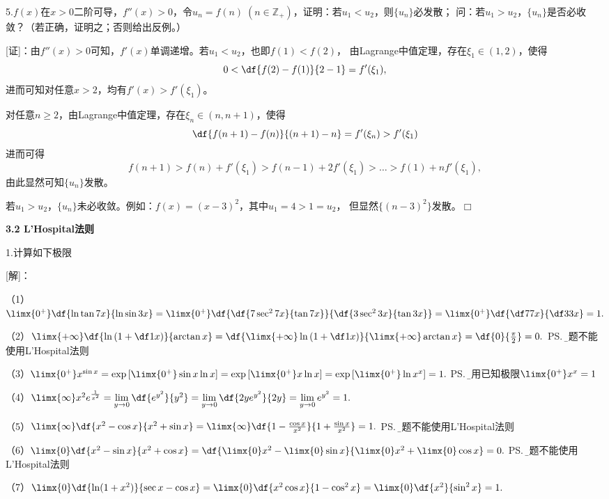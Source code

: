 \bigskip

5.$f(x)$在$x>0$二阶可导，$f''(x)>0$，令$u_n=f(n)\;
 (n\in\mathbb{Z}_+)$，证明：若$u_1<u_2$，则$\{u_n\}$必发散；
问：若$u_1>u_2$，$\{u_n\}$是否必收敛？（若正确，证明之；否则给出反例。）

[证]：由$f''(x)>0$可知，$f'(x)$单调递增。若$u_1<u_2$，也即$f(1)<f(2)$，
由Lagrange中值定理，存在$\xi_1\in(1,2)$，使得
$$0<\df{f(2)-f(1)}{2-1}=f'(\xi_1),$$
进而可知对任意$x>2$，均有$f'(x)>f'(\xi_1)$。

对任意$n\geq2$，由Lagrange中值定理，存在$\xi_n\in(n,n+1)$，使得
$$\df{f(n+1)-f(n)}{(n+1)-n}=f'(\xi_n)>f'(\xi_1)$$
进而可得
$$
f(n+1)>f(n)+f'(\xi_1)>f(n-1)+2f'(\xi_1)>\ldots>f(1)+nf'(\xi_1),
$$
由此显然可知$\{u_n\}$发散。

若$u_1>u_2$，$\{u_n\}$未必收敛。例如：$f(x)=(x-3)^2$，其中$u_1=4>1=u_2$，
但显然$\{(n-3)^2\}$发散。\hfill$\Box$

\begin{center}
	\bf 3.2 L'Hospital法则
\end{center}

\bigskip

1.计算如下极限

[解]：

（1）$\limx{0^+}\df{\ln\tan 7x}{\ln\sin 3x}=\limx{0^+}\df{\df{7\sec^27x}{\tan7x}}{\df{3\sec^23x}{\tan3x}}
=\limx{0^+}\df{\df7{7x}}{\df3{3x}}=1.$

（2）$\limx{+\infty}\df{\ln\left(1+\df1x\right)}{\arctan x}
=\df{\limx{+\infty}\ln\left(1+\df1x\right)}{\limx{+\infty}\arctan
x}=\df{0}{\frac{\pi}2}=0.$
\ps{\b 本题不能使用L'Hospital法则}

（3）$\limx{0^+}x^{\sin x}=\exp\left[\limx{0^+}\sin x\ln x\right]
=\exp\left[\limx{0^+}x\ln x\right]=\exp\left[\limx{0^+}\ln x^x\right]
=1.$
\ps{\b 使用已知极限$\limx{0^+}x^x=1$}

（4）$\limx{\infty}x^2e^{\frac1{x^2}}
=\lim\limits_{y\to0}\df{e^{y^2}}{y^2}
=\lim\limits_{y\to0}\df{2ye^{y^2}}{2y}
=\lim\limits_{y\to0}e^{y^2}=1.$

（5）$\limx{\infty}\df{x^2-\cos x}{x^2+\sin x}
=\limx{\infty}\df{1-\frac{\cos x}{x^2}}{1+\frac{\sin x}{x^2}}=1.$
\ps{\b 本题不能使用L'Hospital法则}

（6）$\limx{0}\df{x^2-\sin x}{x^2+\cos x}
=\df{\limx{0}x^2-\limx{0}\sin x}{\limx{0}x^2+\limx{0}\cos x}=0.$
\ps{\b 本题不能使用L'Hospital法则}

（7）$\limx{0}\df{\ln(1+x^2)}{\sec x-\cos x}
=\limx{0}\df{x^2\cos x}{1-\cos^2 x}
=\limx{0}\df{x^2}{\sin^2 x}=1.$

